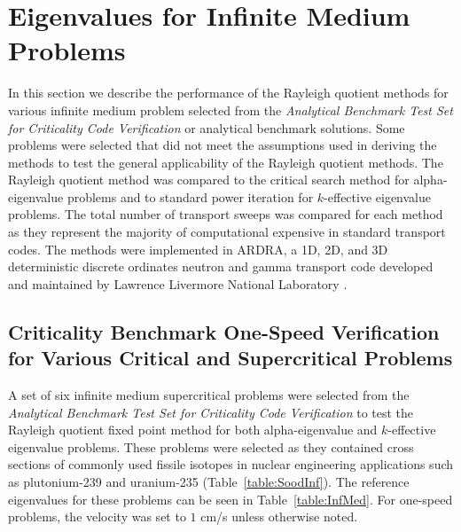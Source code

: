 \chapter{Eigenvalues for Infinite Medium Problems}%

In this section we describe the performance of the Rayleigh quotient methods for various infinite medium problem selected from the \textit{Analytical Benchmark Test Set for Criticality Code Verification} \cite{sood2003analytical} or analytical benchmark solutions. Some problems were selected that did not meet the assumptions used in deriving the methods to test the general applicability of the Rayleigh quotient methods. The Rayleigh quotient method was compared to the critical search method \cite{hill_efficient_1983} for alpha-eigenvalue problems and to standard power iteration for $k$-effective eigenvalue problems. The total number of transport sweeps was compared for each method as they represent the majority of computational expensive in standard transport codes. The methods were implemented in ARDRA, a 1D, 2D, and 3D deterministic discrete ordinates neutron and gamma transport code developed and maintained by Lawrence Livermore National Laboratory \cite{hanebutte_ardra_1999}.





\section{Criticality Benchmark One-Speed Verification for Various Critical and Supercritical Problems}

A set of six infinite medium supercritical problems were selected from the \textit{Analytical Benchmark Test Set for Criticality Code Verification} \cite{sood2003analytical} to test the Rayleigh quotient fixed point method for both alpha-eigenvalue and $k$-effective eigenvalue problems. These problems were selected as they contained cross sections of commonly used fissile isotopes in nuclear engineering applications such as plutonium-239 and uranium-235 (Table~\ref{table:SoodInf}). The reference eigenvalues for these problems can be seen in Table~\ref{table:InfMed}. For one-speed problems, the velocity was set to $1$ cm/s unless otherwise noted.

